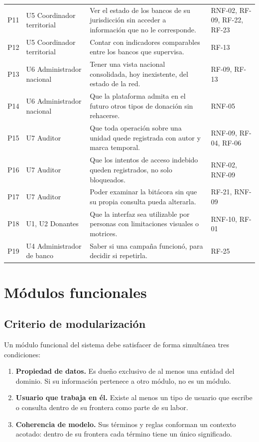 \documentclass[11pt,a4paper]{article}
\begin{document}
\begin{longtable}{L{0.9cm} L{3.0cm} L{7.4cm} L{2.4cm}}
P11 & U5 Coordinador territorial & Ver el estado de los bancos de su jurisdicción sin acceder a información que no le corresponde. & RNF-02, RF-09, RF-22, RF-23 \\
P12 & U5 Coordinador territorial & Contar con indicadores comparables entre los bancos que supervisa. & RF-13 \\
P13 & U6 Administrador nacional & Tener una vista nacional consolidada, hoy inexistente, del estado de la red. & RF-09, RF-13 \\
P14 & U6 Administrador nacional & Que la plataforma admita en el futuro otros tipos de donación sin rehacerse. & RNF-05 \\
P15 & U7 Auditor & Que toda operación sobre una unidad quede registrada con autor y marca temporal. & RNF-09, RF-04, RF-06 \\
P16 & U7 Auditor & Que los intentos de acceso indebido queden registrados, no solo bloqueados. & RNF-02, RNF-09 \\
P17 & U7 Auditor & Poder examinar la bitácora sin que su propia consulta pueda alterarla. & RF-21, RNF-09 \\
P18 & U1, U2 Donantes & Que la interfaz sea utilizable por personas con limitaciones visuales o motrices. & RNF-10, RF-01 \\
P19 & U4 Administrador de banco & Saber si una campaña funcionó, para decidir si repetirla. & RF-25 \\
\end{longtable}

\section{Módulos funcionales}
\label{sec:modulos}

\subsection{Criterio de modularización}

Un módulo funcional del sistema debe satisfacer de forma simultánea tres condiciones:

\begin{enumerate}
\item \textbf{Propiedad de datos.} Es dueño exclusivo de al menos una entidad del dominio. Si su información pertenece a otro módulo, no es un módulo.
\item \textbf{Usuario que trabaja en él.} Existe al menos un tipo de usuario que escribe o consulta dentro de su frontera como parte de su labor.
\item \textbf{Coherencia de modelo.} Sus términos y reglas conforman un contexto acotado: dentro de su frontera cada término tiene un único significado.
\end{enumerate}
\end{document}
